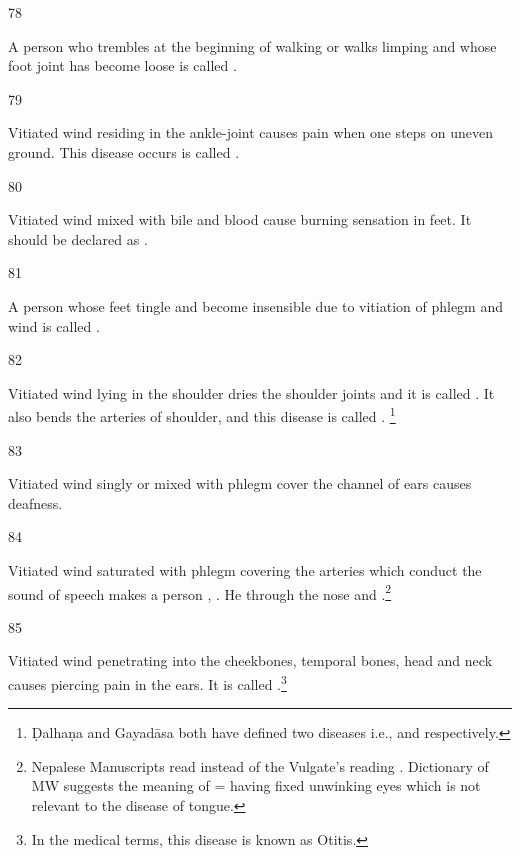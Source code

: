 \begin{translation}
{\item[78]

	A person who trembles at the beginning of walking or walks limping and
	whose foot joint has become loose is called
	.

\item[79]

	Vitiated wind residing in the ankle-joint causes pain when one steps on
	uneven ground. This disease occurs is called .

\item[80]

	Vitiated wind mixed with bile and blood cause burning sensation in feet.
	It should be declared as .

\item[81]

	A person whose feet tingle and become insensible due to vitiation of
	phlegm and wind is called .

\item[82]

	Vitiated wind lying in the shoulder dries the shoulder joints and it is
	called . It also bends the arteries of shoulder, and this
	disease is called . \footnote{Ḍalhaṇa and Gayadāsa both have
	defined two diseases i.e.,  and  respectively.}

\item[83]

	Vitiated wind singly or mixed with phlegm cover the channel of ears
	causes deafness.

\item[84]

	Vitiated wind saturated with phlegm covering the arteries which conduct
	the sound of speech makes a person ,
	. He  through the nose and
	.\footnote{Nepalese Manuscripts read 
	instead of the Vulgate’s reading . Dictionary of MW suggests
	the meaning of  = having fixed unwinking eyes which is not
	relevant to the disease of tongue.}

\item[85]

	Vitiated wind penetrating into the cheekbones, temporal bones, head and
	neck causes piercing pain in the ears. It is called
	.\footnote{In the medical terms, this disease is
	known as Otitis.}

}
\end{translation}
